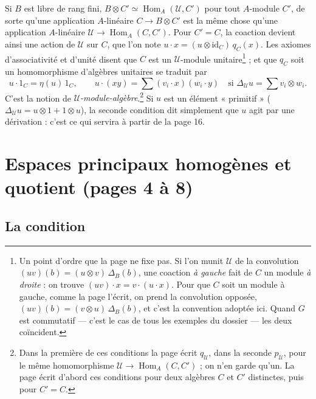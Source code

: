 \documentclass[11pt,a4paper]{article}
\begin{document}
Si $B$ est libre de rang fini, $B \otimes C' \simeq
\operatorname{Hom}_A(\mathcal{U}, C')$ pour tout $A$-module $C'$, de sorte
qu'une application $A$-linéaire $C \to B \otimes C'$ est la même chose qu'une
application $A$-linéaire $\mathcal{U} \to \operatorname{Hom}_A(C, C')$. Pour
$C' = C$, la coaction devient ainsi une action de $\mathcal{U}$ sur $C$, que
l'on note $u \cdot x = (u \otimes \mathrm{id}_C)\, q_C(x)$. Les axiomes
d'associativité et d'unité disent que $C$ est un $\mathcal{U}$-module
unitaire\footnote{Un point d'ordre que la page ne fixe pas. Si l'on munit
$\mathcal{U}$ de la convolution $(uv)(b) = (u \otimes v)\,\Delta_B(b)$, une
coaction \emph{à gauche} fait de $C$ un module \emph{à droite} : on trouve
$(uv)\cdot x = v \cdot (u \cdot x)$. Pour que $C$ soit un module à gauche,
comme la page l'écrit, on prend la convolution opposée,
$(uv)(b) = (v \otimes u)\,\Delta_B(b)$, et c'est la convention adoptée ici.
Quand $G$ est commutatif --- c'est le cas de tous les exemples du dossier ---
les deux coïncident.} ; et que $q_C$ soit un homomorphisme d'algèbres
unitaires se traduit par
\[
u \cdot 1_C = \eta(u)\, 1_C, \qquad
u \cdot (xy) = \sum (v_i \cdot x)(w_i \cdot y)
\quad\text{si } \Delta_{\mathcal{U}} u = \sum v_i \otimes w_i .
\]
C'est la notion de \emph{$\mathcal{U}$-module-algèbre}.\footnote{Dans la
première de ces conditions la page écrit $q_{\mathcal{U}}$, dans la seconde
$p_{\mathcal{U}}$, pour le même homomorphisme $\mathcal{U} \to
\operatorname{Hom}_A(C, C')$ ; on n'en garde qu'un. La page écrit d'abord ces
conditions pour deux algèbres $C$ et $C'$ distinctes, puis pour $C' = C$.}
Si $u$ est un élément « primitif » ($\Delta_{\mathcal{U}} u = u \otimes 1 +
1 \otimes u$), la seconde condition dit simplement que $u$ agit par une
dérivation : c'est ce qui servira à partir de la page 16.

\section*{Espaces principaux homogènes et quotient (pages 4 à 8)}

\subsection*{La condition}
\end{document}
